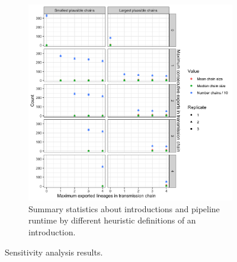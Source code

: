 \documentclass[9pt,twoside,lineno]{pnas-new}
\begin{document}
\begin{figure}[H]
\begin{subfigure}[b]{0.95\textwidth}
\centering
\includegraphics[width = 11.4cm]{figures/fig_SX_sensitivity_chain_defn.png}
\caption{Summary statistics about introductions and pipeline runtime by different heuristic definitions of an introduction.}  
\end{subfigure}
\caption{Sensitivity analysis results.}
\label{fig:sensitivity_figs}
\end{figure}
\end{document}

